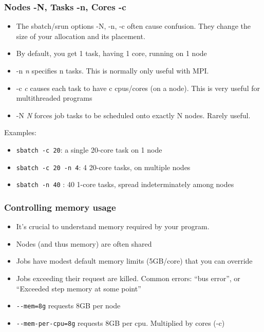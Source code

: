 \documentclass[10pt]{beamer}
\begin{document}
\begin{frame}[fragile]
\frametitle{Nodes -N, Tasks -n, Cores -c}
\begin{itemize}
\item The sbatch/srun options -N, -n, -c often cause confusion.  They change the size of your allocation and its placement.
\item By default, you get 1 task, having 1 core, running on 1 node
\item -n \textit{n} specifies n tasks.  This is normally only useful with MPI.
\item -c \textit{c} causes each task to have c cpus/cores (on a node).  This is very useful for multithreaded programs
\item -N \textit{N} forces job tasks to be scheduled onto exactly N nodes.  Rarely useful.
\end{itemize}

Examples:
\begin{itemize}
\item \verb+sbatch -c 20+: a single 20-core task on 1 node
\item \verb+sbatch -c 20 -n 4+: 4 20-core tasks, on multiple nodes
\item \verb+sbatch -n 40+ : 40 1-core tasks, spread indeterminately among nodes
\end{itemize}
\end{frame}

\begin{frame}[fragile]
\frametitle{Controlling memory usage}
\begin{itemize}
\item It's crucial to understand memory required by your program.
\item Nodes (and thus memory) are often shared
\item Jobs have modest default memory limits (5GB/core) that you can override
\item Jobs exceeding their request are killed.  Common errors: ``bus error'', or ``Exceeded step memory at some point''
\item \verb+--mem=8g+ requests 8GB per node
\item \verb+--mem-per-cpu=8g+ requests 8GB per cpu.  Multiplied by cores (-c)
\end{itemize}
\end{frame}
\end{document}
